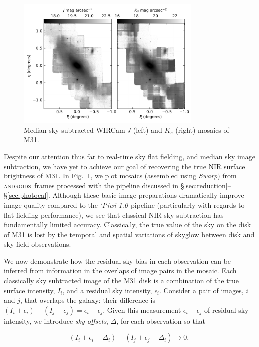 \documentclass[iop]{emulateapj}
\newcommand{\sw}[1]{\textit{#1}} %
\newcommand{\iiwione}{\sw{`I`iwi 1.0}}
\newcommand{\androids}{\textsc{androids}}
\newcommand{\Fig}[1]{Fig.~\ref{fig:#1}}  %
\newcommand{\Sec}[1]{\S\ref{sec:#1}}  %
\begin{document}
\begin{figure}[t]
\centering
\includegraphics[width=3.5in]{figs/raw_mosaics}
\caption{Median sky subtracted WIRCam $J$ (left) and $K_s$ (right) mosaics of M31.}
\label{fig:raw_mosaics}
\end{figure}

Despite our attention thus far to real-time sky flat fielding, and median sky image subtraction, we have yet to achieve our goal of recovering the true NIR surface brightness of M31.
In \Fig{raw_mosaics}, we plot mosaics (assembled using \sw{Swarp}) from \androids\ frames processed with the pipeline discussed in \Sec{reduction}--\Sec{photocal}.
Although these basic image preparations dramatically improve image quality compared to the \iiwione\ pipeline (particularly with regards to flat fielding performance), we see that classical NIR sky subtraction has fundamentally limited accuracy.
Classically, the true value of the sky on the disk of M31 is lost by the temporal and spatial variations of skyglow between disk and sky field observations.

We now demonstrate how the residual sky bias in each observation can be inferred from information in the overlaps of image pairs in the mosaic.
Each classically sky subtracted image of the M31 disk is a combination of the true surface intensity, $I_i$, and a residual sky intensity, $\epsilon_i$.
Consider a pair of images, $i$ and $j$, that overlaps the galaxy: their difference is $(I_i+\epsilon_i) - (I_j+\epsilon_j) = \epsilon_i - \epsilon_j$.
Given this measurement $\epsilon_i - \epsilon_j$ of residual sky intensity, we introduce \emph{sky offsets}, $\Delta$, for each observation so that

\begin{equation}
    (I_i + \epsilon_i - \Delta_i) - (I_j + \epsilon_j - \Delta_i) \rightarrow 0,
\end{equation}
\end{document}

